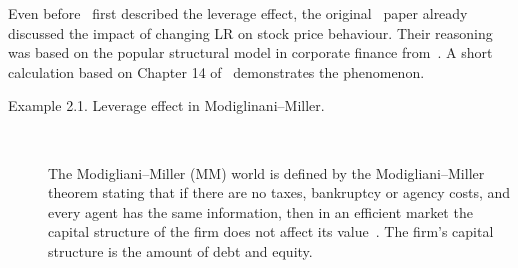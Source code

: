 Even before~\citet{black1976studies} first described the leverage effect, the original~\citet{black1973pricing} paper already discussed the impact of changing LR on stock price behaviour.
Their reasoning was based on the popular structural model in corporate finance from~\citet{modigliani1958cost}.
A short calculation based on Chapter 14 of~\citet{berk2007corporate} demonstrates the phenomenon.
\begin{description}
	\item[Example 2.1. Leverage effect in Modiglinani--Miller.]~
	
	The Modigliani--Miller (MM) world is defined by the Modigliani--Miller theorem stating that if there are no taxes, bankruptcy or agency costs, and every agent has the same information, then in an efficient market the capital structure of the firm does not affect its value~\citep{modigliani1958cost}.
	The firm's capital structure is the amount of debt and equity.
	

\end{description}
